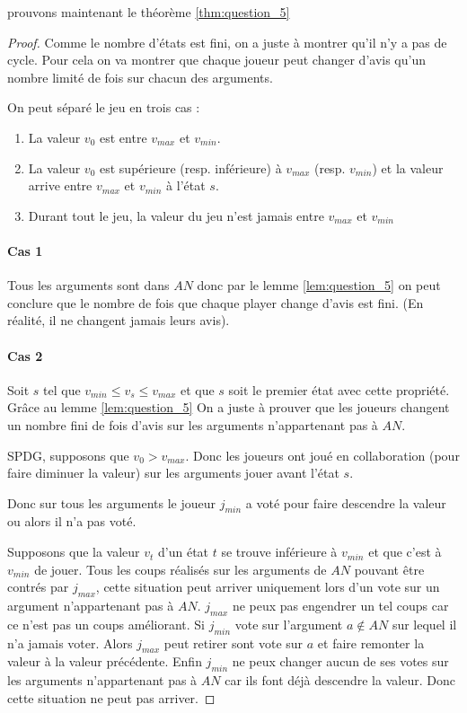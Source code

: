 \documentclass[12pt]{article}
\theoremstyle{defi}
\theoremstyle{not}
\theoremstyle{prob}
\begin{document}
      prouvons maintenant le théorème \ref{thm:question_5}
      \begin{proof}
        Comme le nombre d'états est fini, on a juste à montrer qu'il n'y a pas de cycle. Pour cela on va montrer que chaque joueur peut changer d'avis qu'un nombre limité de fois sur chacun des arguments.

        On peut séparé le jeu en trois cas :
        \begin{enumerate}
          \item La valeur $v_0$ est entre  $v_{max}$ et $v_{min}$.
          \item La valeur $v_0$ est supérieure (resp. inférieure) à $v_{max}$ (resp. $v_{min}$) et la valeur arrive entre $v_{max}$ et $v_{min}$ à l'état $s$.
          \item Durant tout le jeu, la valeur du jeu n'est jamais entre $v_{max}$ et $v_{min}$
        \end{enumerate}

        \paragraph{Cas 1}
        Tous les arguments sont dans $AN$ donc par le lemme \ref{lem:question_5} on peut conclure que le nombre de fois que chaque player change d'avis est fini. (En réalité, il ne changent jamais leurs avis).

        \paragraph{Cas 2}
        Soit $s$ tel que $v_{min} \leq v_s \leq v_{max}$ et que $s$ soit le premier état avec cette propriété. Grâce au lemme \ref{lem:question_5} On a juste à prouver que les joueurs changent un nombre fini de fois d'avis sur les arguments n'appartenant pas à $AN$.

        SPDG, supposons que $v_0 > v_{max}$. Donc les joueurs ont joué en collaboration (pour faire diminuer la valeur) sur les arguments jouer avant l'état $s$.

        Donc sur tous les arguments le joueur $j_{min}$ a voté pour faire descendre la valeur ou alors il n'a pas voté.

        Supposons que la valeur $v_t$ d'un état $t$ se trouve inférieure à $v_{min}$ et que c'est à $v_{min}$ de jouer.
        Tous les coups réalisés sur les arguments de $AN$ pouvant être contrés par $j_{max}$, cette situation peut arriver uniquement lors d'un vote sur un argument n'appartenant pas à $AN$.
        $j_{max}$ ne peux pas engendrer un tel coups car ce n'est pas un coups améliorant.
        Si $j_{min}$ vote sur l'argument $a \not\in AN$ sur lequel il n'a jamais voter.
        Alors $j_{max}$ peut retirer sont vote sur $a$ et faire remonter la valeur à la valeur précédente.
        Enfin $j_{min}$ ne peux changer aucun de ses votes sur les arguments n'appartenant pas à $AN$ car ils font déjà descendre la valeur.
        Donc cette situation ne peut pas arriver.


\end{proof}
\end{document}
